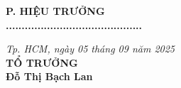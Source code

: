 \documentclass[12pt,a4paper]{article}
\begin{document}
\vspace{1cm}
\noindent
\begin{minipage}[t]{0.45\textwidth}
    \centering
    \textbf{P. HIỆU TRƯỞNG}\\
    \vspace{2.5cm}
    \textbf{...........................................}
\end{minipage}
\hfill
\begin{minipage}[t]{0.45\textwidth}
    \centering
    \textit{Tp. HCM, ngày 05 tháng 09 năm 2025}\\
    \textbf{TỔ TRƯỞNG}\\
    \vspace{2cm}
    \textbf{Đỗ Thị Bạch Lan}
\end{minipage}
\end{document}
